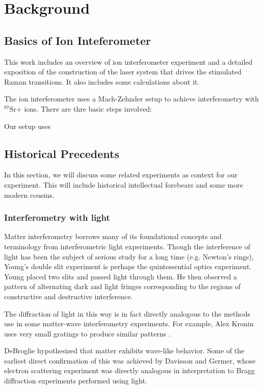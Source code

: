 


\chapter{Background}

\section{Basics of Ion Inteferometer}

This work includes an overview of ion interferometer experiment and a detailed exposition of the construction of the laser system that drives the stimulated Raman transitions. It also includes some calculations about it. 

The ion interferometer uses a Mach-Zehnder setup to achieve interferometry with $^{87}$Sr+ ions. There are thre basic steps involved: 



Our setup uses 


\section{Historical Precedents}
In this section, we will discuss some related experiments as context for our experiment. This will include historical intellectual forebears and some more modern cousins. 
 \subsection{Interferometry with light}
Matter interferometry borrows many of its foundational concepts and terminology from interferometric light experiments. Though the interference of light has been the subject of serious study for a long time (e.g. Newton's rings), Young's double slit experiment is perhaps the quintessential optics experiment. Young placed two slits and passed light through them. He then observed a pattern of alternating dark and light fringes corresponding to the regions of constructive and destructive interference. 

The diffraction of light in this way is in fact directly analogous to the methods use in some matter-wave interferometry experiments. For example, Alex Kronin uses very small gratings to produce similar patterns \cite{Kronin_RMP}. 

DeBroglie hypothesized that matter exhibits wave-like behavior. Some of the earliest direct confirmation of this was achieved by Davisson and Germer, whose electron scattering experiment was directly analogous in interpretation to Bragg diffraction experiments performed using light. 

